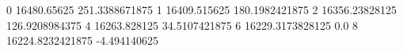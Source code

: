0 16480.65625 251.3388671875
1 16409.515625 180.1982421875
2 16356.23828125 126.9208984375
4 16263.828125 34.5107421875
6 16229.3173828125 0.0
8 16224.8232421875 -4.494140625
